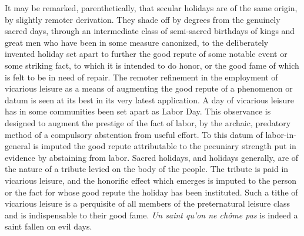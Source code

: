 \documentclass[12pt]{report}
\begin{document}
It may be remarked, parenthetically, that secular holidays are of the
same origin, by slightly remoter derivation. They shade off by degrees
from the genuinely sacred days, through an intermediate class of
semi-sacred birthdays of kings and great men who have been in some
measure canonized, to the deliberately invented holiday set apart to
further the good repute of some notable event or some striking fact, to
which it is intended to do honor, or the good fame of which is felt
to be in need of repair. The remoter refinement in the employment
of vicarious leisure as a means of augmenting the good repute of a
phenomenon or datum is seen at its best in its very latest application.
A day of vicarious leisure has in some communities been set apart as
Labor Day. This observance is designed to augment the prestige of
the fact of labor, by the archaic, predatory method of a compulsory
abstention from useful effort. To this datum of labor-in-general is
imputed the good repute attributable to the pecuniary strength put
in evidence by abstaining from labor. Sacred holidays, and holidays
generally, are of the nature of a tribute levied on the body of the
people. The tribute is paid in vicarious leisure, and the honorific
effect which emerges is imputed to the person or the fact for whose
good repute the holiday has been instituted. Such a tithe of vicarious
leisure is a perquisite of all members of the preternatural leisure
class and is indispensable to their good fame. \emph{Un saint qu'on ne chôme
pas} is indeed a saint fallen on evil days.
\end{document}
